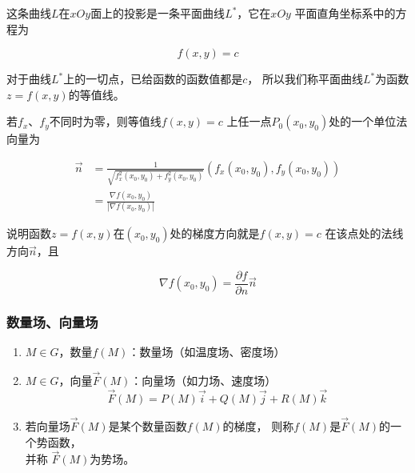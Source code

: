\documentclass[12pt, a4paper]{article}
\numberwithin{equation}{section}
\begin{document}
    这条曲线\(L\)在\(xOy\)面上的投影是一条平面曲线\(L^{*}\)，它在\(xOy\)
    平面直角坐标系中的方程为

    \[
        f\left(x,y\right) = c
    \]

    对于曲线\(L^{*}\)上的一切点，已给函数的函数值都是\(c\)，
    所以我们称平面曲线\(L^{*}\)为函数\(z=f\left(x,y\right)\)的等值线。

    若\(f_x\)、\(f_y\)不同时为零，则等值线\(f\left(x,y\right) = c\)
    上任一点\(P_0\left(x_0,y_0\right)\)处的一个单位法向量为

    \begin{equation}
        \begin{aligned}
            \overrightarrow{n} & =\frac{1}{\sqrt{f_x^2\left(x_0, y_0\right)+f_y^2\left(x_0, y_0\right)}}\left(f_x\left(x_0, y_0\right), f_y\left(x_0, y_0\right)\right) \\
            & =\frac{\nabla f\left(x_0, y_0\right)}{\left|\nabla f\left(x_0, y_0\right)\right|}
        \end{aligned}
    \end{equation}

    说明函数\(z=f\left(x,y\right)\)在\(\left(x_0,y_0\right)\)处的梯度方向就是\(f\left(x,y\right) = c\)
    在该点处的法线方向\(\overrightarrow{n}\)，且

    \begin{equation}
        \nabla f\left(x_0, y_0\right)=\frac{\partial f}{\partial n} \overrightarrow{n}
    \end{equation}

\subsubsection{数量场、向量场}

    \begin{enumerate}
        \item \(M \in G\)，数量\(f\left(M\right)\)：数量场（如温度场、密度场）
        \item \(M \in G\)，向量\(\overrightarrow{F}\left(M\right)\)：向量场（如力场、速度场）
            $$
                \overrightarrow{F}(M)=P(M) \overrightarrow{i}+Q(M) \overrightarrow{j}+R(M) \overrightarrow{k}
            $$
        \item 若向量场\(\overrightarrow{F}\left(M\right)\)是某个数量函数\(f\left(M\right)\)的梯度，
            则称\(f\left(M\right)\)是\(\overrightarrow{F}\left(M\right)\)的一个势函数，\\并称
            \(\overrightarrow{F}\left(M\right)\)为势场。
    \end{enumerate}
\end{document}
